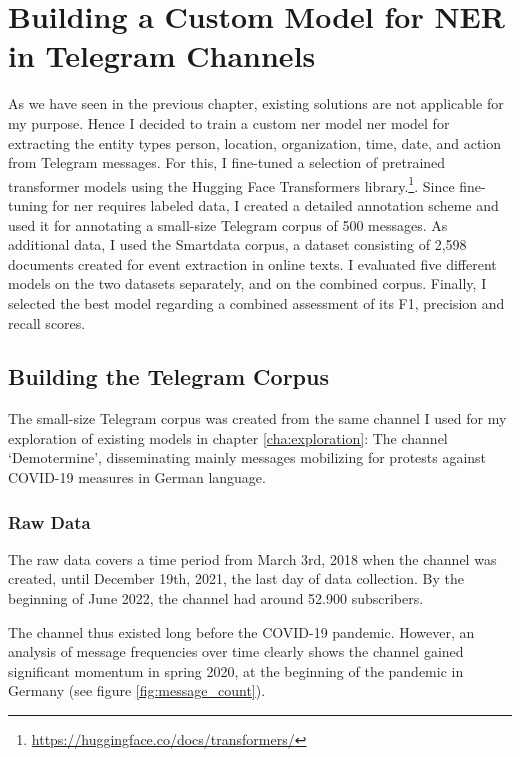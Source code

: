 \chapter{Building a Custom Model for NER in Telegram Channels}
\label{cha:implementation}

As we have seen in the previous chapter, existing solutions are not applicable for my purpose. Hence I decided to train a custom \gls{ner} model \gls{ner} model for extracting the entity types person, location, organization, time, date, and action from Telegram messages. 
For this, I fine-tuned a selection of pretrained transformer models using the Hugging Face Transformers library.\footnote{\url{https://huggingface.co/docs/transformers/}}. Since fine-tuning for \gls{ner} requires labeled data, I created a detailed annotation scheme and used it for annotating a small-size Telegram corpus of 500 messages. As additional data, I used the Smartdata corpus, a dataset consisting of 2,598 documents created for event extraction in online texts. 
I evaluated five different models on the two datasets separately, and on the combined corpus. Finally, I selected the best model regarding a combined assessment of its F1, precision and recall scores.

\section{Building the Telegram Corpus}
\label{sec:telegram_data}

The small-size Telegram corpus was created from the same channel I used for my exploration of existing models in chapter \ref{cha:exploration}: The channel `Demotermine', disseminating mainly messages mobilizing for protests against COVID-19 measures in German language. 

\subsection{Raw Data}
The raw data covers a time period from March 3rd, 2018 when the channel was created, until December 19th, 2021, the last day of data collection. By the beginning of June 2022, the channel had around 52.900 subscribers. 

The channel thus existed long before the COVID-19 pandemic. However, an analysis of message frequencies over time clearly shows the channel gained significant momentum in spring 2020, at the beginning of the pandemic in Germany (see figure \ref{fig:message_count}).


